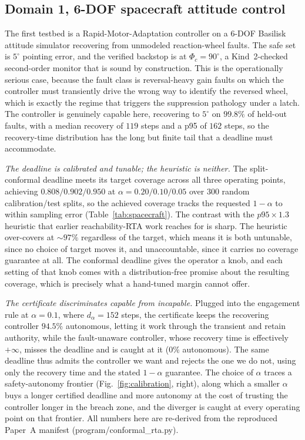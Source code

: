 \documentclass[11pt]{article}
\theoremstyle{plain}
\theoremstyle{definition}
\newcommand{\dalpha}{d_{\alpha}}
\begin{document}
\subsection{Domain 1, 6-DOF spacecraft attitude control}
The first testbed is a Rapid-Motor-Adaptation controller on a 6-DOF Basilisk attitude
simulator recovering from unmodeled reaction-wheel faults. The safe set is $5^\circ$ pointing
error, and the verified backstop is at $\Phi_c=90^\circ$, a Kind~2-checked second-order
monitor that is sound by construction. This is the operationally serious case, because the
fault class is reversal-heavy gain faults on which the controller must transiently drive the
wrong way to identify the reversed wheel, which is exactly the regime that triggers the
suppression pathology under a latch. The controller is genuinely capable here, recovering to
$5^\circ$ on $99.8\%$ of held-out faults, with a median recovery of $119$ steps and a p95 of
$162$ steps, so the recovery-time distribution has the long but finite tail that a deadline
must accommodate.

\emph{The deadline is calibrated and tunable; the heuristic is neither.} The split-conformal
deadline meets its target coverage across all three operating points, achieving
$0.808/0.902/0.950$ at $\alpha=0.20/0.10/0.05$ over $300$ random calibration/test splits, so
the achieved coverage tracks the requested $1-\alpha$ to within sampling error
(Table~\ref{tab:spacecraft}). The contrast with the $p95\times1.3$ heuristic that earlier
reachability-RTA work reaches for is sharp. The heuristic over-covers at ${\sim}97\%$
regardless of the target, which means it is both untunable, since no choice of target moves
it, and unaccountable, since it carries no coverage guarantee at all. The conformal deadline
gives the operator a knob, and each setting of that knob comes with a distribution-free
promise about the resulting coverage, which is precisely what a hand-tuned margin cannot
offer.

\emph{The certificate discriminates capable from incapable.} Plugged into the engagement rule
at $\alpha=0.1$, where $\dalpha=152$ steps, the certificate keeps the recovering controller
$94.5\%$ autonomous, letting it work through the transient and retain authority, while the
fault-unaware controller, whose recovery time is effectively $+\infty$, misses the deadline
and is caught at it ($0\%$ autonomous). The same deadline thus admits the controller we want
and rejects the one we do not, using only the recovery time and the stated $1-\alpha$
guarantee. The choice of $\alpha$ traces a safety-autonomy frontier (Fig.~\ref{fig:calibration},
right), along which a smaller $\alpha$ buys a longer certified deadline and more autonomy at
the cost of trusting the controller longer in the breach zone, and the diverger is caught at
every operating point on that frontier. All numbers here are re-derived from the reproduced
Paper~A manifest (program/conformal\_rta.py).
\end{document}
